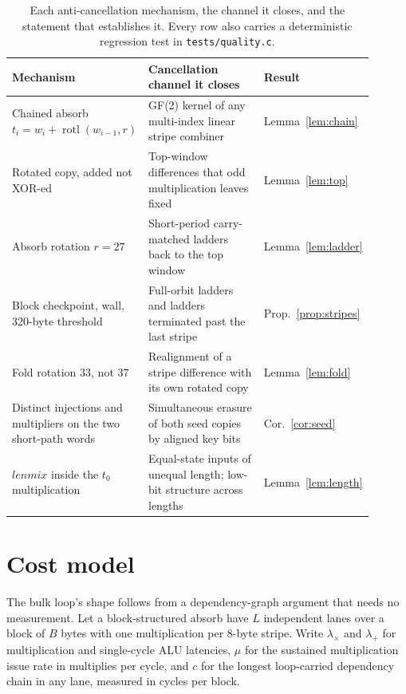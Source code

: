 \documentclass[10pt,a4paper]{article}
\theoremstyle{remark}
\newcommand{\rotl}{\operatorname{rotl}}
\begin{document}
\begin{table}[t]
\small
\centering
\begin{tabular}{@{}L{0.26\linewidth}L{0.34\linewidth}L{0.30\linewidth}@{}}
\toprule
Mechanism & Cancellation channel it closes & Result \\
\midrule
Chained absorb \(t_i = w_i + \rotl(w_{i-1},r)\) &
GF(2) kernel of any multi-index linear stripe combiner &
Lemma~\ref{lem:chain} \\
\addlinespace
Rotated copy, added not XOR-ed &
Top-window differences that odd multiplication leaves fixed &
Lemma~\ref{lem:top} \\
\addlinespace
Absorb rotation \(r = 27\) &
Short-period carry-matched ladders back to the top window &
Lemma~\ref{lem:ladder} \\
\addlinespace
Block checkpoint, wall, 320-byte threshold &
Full-orbit ladders and ladders terminated past the last stripe &
Prop.~\ref{prop:stripes} \\
\addlinespace
Fold rotation \(33\), not \(37\) &
Realignment of a stripe difference with its own rotated copy &
Lemma~\ref{lem:fold} \\
\addlinespace
Distinct injections and multipliers on the two short-path words &
Simultaneous erasure of both seed copies by aligned key bits &
Cor.~\ref{cor:seed} \\
\addlinespace
\(\mathit{lenmix}\) inside the \(t_0\) multiplication &
Equal-state inputs of unequal length; low-bit structure across lengths &
Lemma~\ref{lem:length} \\
\bottomrule
\end{tabular}
\caption{Each anti-cancellation mechanism, the channel it closes, and the
statement that establishes it.  Every row also carries a deterministic
regression test in \texttt{tests/quality.c}.}
\label{tab:mechanisms}
\end{table}

\section{Cost model}
\label{sec:cost}

The bulk loop's shape follows from a dependency-graph argument that needs no
measurement.  Let a block-structured absorb have \(L\) independent lanes over
a block of \(B\) bytes with one multiplication per 8-byte stripe.  Write
\(\lambda_\times\) and \(\lambda_+\) for multiplication and single-cycle ALU
latencies, \(\mu\) for the sustained multiplication issue rate in multiplies
per cycle, and \(c\) for the longest loop-carried dependency chain in any
lane, measured in cycles per block.
\end{document}
